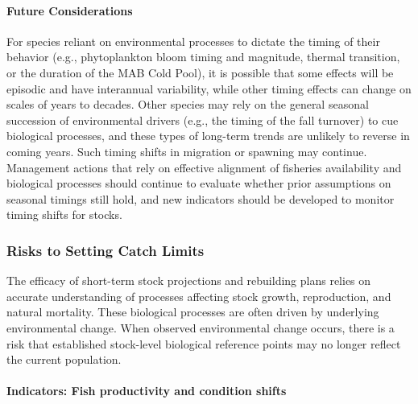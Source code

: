 \documentclass[
  10pt,
]{article}
\begin{document}
\hypertarget{future-considerations-1}{%
\paragraph{Future Considerations}\label{future-considerations-1}}

For species reliant on environmental processes to dictate the timing of their behavior (e.g., phytoplankton bloom timing and magnitude, thermal transition, or the duration of the MAB Cold Pool), it is possible that some effects will be episodic and have interannual variability, while other timing effects can change on scales of years to decades. Other species may rely on the general seasonal succession of environmental drivers (e.g., the timing of the fall turnover) to cue biological processes, and these types of long-term trends are unlikely to reverse in coming years. Such timing shifts in migration or spawning may continue. Management actions that rely on effective alignment of fisheries availability and biological processes should continue to evaluate whether prior assumptions on seasonal timings still hold, and new indicators should be developed to monitor timing shifts for stocks.

\hypertarget{risks-to-setting-catch-limits}{%
\subsubsection{Risks to Setting Catch Limits}\label{risks-to-setting-catch-limits}}

The efficacy of short-term stock projections and rebuilding plans relies on accurate understanding of processes affecting stock growth, reproduction, and natural mortality. These biological processes are often driven by underlying environmental change. When observed environmental change occurs, there is a risk that established stock-level biological reference points may no longer reflect the current population.

\hypertarget{indicators-fish-productivity-and-condition-shifts}{%
\paragraph{Indicators: Fish productivity and condition shifts}\label{indicators-fish-productivity-and-condition-shifts}}
\end{document}
